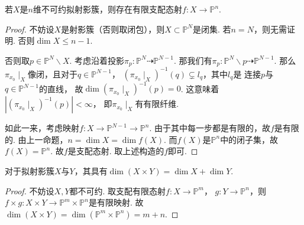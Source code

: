     \begin{corollary}
        若$X$是$n$维不可约拟射影簇，则存在有限支配态射$f\colon X \rightarrow \mathbb{P}^{n}$.
    \end{corollary}
    \begin{proof}
        不妨设$X$是射影簇（否则取闭包），则$X \subset \mathbb{P}^{N}$是闭集.  
        若$n=N$，则无需证明. 否则$\dim X \leq n-1$.

        否则取$p \in \mathbb{P}^{N}\backslash X$.
        考虑沿着投影$\pi_{p}\colon\mathbb{P}^{N} \dashrightarrow \mathbb{P}^{N-1}$.
        那我们有$\pi_{p}\colon\mathbb{P}^{N}\backslash p \dashrightarrow \mathbb{P}^{N-1}$.
        那么$\pi_{x_{0}}\mid_{X}$像闭，且对于$q \in \mathbb{P}^{N-1}$，
        $(\pi_{x_{0}}\mid_{X})^{-1}(q) \subsetneq l_{q}$，其中$l_{q}$是
        连接$p$与$q \in \mathbb{P}^{N-1}$的直线，
        故$\dim(\pi_{x_{0}}\mid_{X})^{-1}(p)=0$. 
        这意味着$|(\pi_{x_{0}}\mid_{X})^{-1}(p)| < \infty$，
        即$\pi_{x_{0}}\mid_{X}$有有限纤维.

        如此一来，考虑映射$f\colon X \rightarrow \mathbb{P}^{N-1} \rightarrow \mathbb{P}^{n}$.
        由于其中每一步都是有限的，故$f$是有限的. 由上一命题，$n=\dim X=\dim f(X)$. 
        而$f(X)$是$\mathbb{P}^{n}$中的闭子集，故$f(X) = \mathbb{P}^{n}$. 
        故$f$是支配态射. 取上述构造的$f$即可. 
    \end{proof}

    \begin{corollary}
        对于拟射影簇$X$与$Y$，其具有$\dim (X \times Y) = \dim X + \dim Y$.
    \end{corollary}
    \begin{proof}
        不妨设$X,Y$都不可约. 取支配有限态射$f\colon X \rightarrow \mathbb{P}^{m}$，
        $g\colon Y \rightarrow \mathbb{P}^{n}$，则
        $f \times g\colon X \times Y \rightarrow \mathbb{P}^{m} \times \mathbb{P}^{n}$是有限映射.
        故$\dim(X \times Y)=\dim(\mathbb{P}^{m}\times\mathbb{P}^{n})=m+n$.
    \end{proof}


